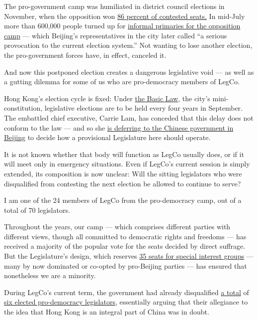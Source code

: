 The pro-government camp was humiliated in district council elections in
November, when the opposition won
\href{https://www.nytimes.com/2019/11/24/world/asia/hong-kong-election-results.html}{86
percent of contested seats.} In mid-July more than 600,000 people turned
up for
\href{https://hongkongfp.com/2020/07/14/serious-provocation-beijing-blasts-hong-kong-democrat-primaries-after-initial-results-reveal/}{informal
primaries for the opposition camp} --- which Beijing's representatives
in the city later called ``a serious provocation to the current election
system.'' Not wanting to lose another election, the pro-government
forces have, in effect, canceled it.

And now this postponed election creates a dangerous legislative void ---
as well as a gutting dilemma for some of us who are pro-democracy
members of LegCo.

Hong Kong's election cycle is fixed: Under
\href{https://www.basiclaw.gov.hk/en/basiclawtext/images/basiclaw_full_text_en.pdf}{the
Basic Law}, the city's mini-constitution, legislative elections are to
be held every four years in September. The embattled chief executive,
Carrie Lam, has conceded that this delay does not conform to the law ---
and so she
\href{https://www.info.gov.hk/gia/general/202007/31/P2020073101081.htm?fontSize=1}{is
deferring to the Chinese government in Beijing} to decide how a
provisional Legislature here should operate.

It is not known whether that body will function as LegCo usually does,
or if it will meet only in emergency situations. Even if LegCo's current
session is simply extended, its composition is now unclear: Will the
sitting legislators who were disqualified from contesting the next
election be allowed to continue to serve?

I am one of the 24 members of LegCo from the pro-democracy camp, out of
a total of 70 legislators.

Throughout the years, our camp --- which comprises different parties
with different views, though all committed to democratic rights and
freedoms --- has received a majority of the popular vote for the seats
decided by direct suffrage. But the Legislature's design, which reserves
\href{https://www.reo.gov.hk/en/voter/FC.htm}{35 seats for special
interest groups} --- many by now dominated or co-opted by pro-Beijing
parties --- has ensured that nonetheless we are a minority.

During LegCo's current term, the government had already disqualified
\href{https://www.nytimes.com/2016/11/08/world/asia/china-hong-kong-sixtus-leung-yau-wai-ching.html}{a
total} of
\href{https://www.nytimes.com/2017/07/14/world/asia/hong-kong-court-pro-democracy-lawmakers.html}{six
elected pro-democracy legislators}, essentially arguing that their
allegiance to the idea that Hong Kong is an integral part of China was
in doubt.


